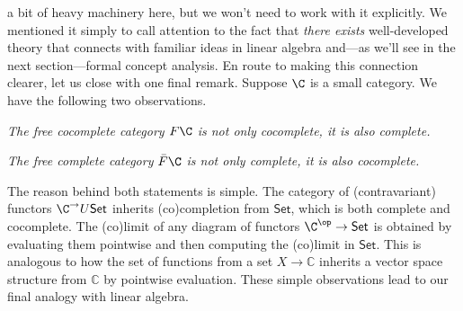 
 a bit of heavy machinery here, but we won't need to work with it explicitly. We mentioned it simply to call attention to the fact that \textit{there exists} well-developed theory that connects with familiar ideas in linear algebra and---as we'll see in the next section---formal concept analysis. En route to making this connection clearer, let us close with one final remark. Suppose $\C$ is a small category. We have the following two observations.
\begin{description}
\item \textit{The free cocomplete category $F\C$ is not only cocomplete, it is also complete.}

\item \textit{The free complete category $\bar F \C$ is not only complete, it is also cocomplete.}
\end{description}
The reason behind both statements is simple. The category of (contravariant) functors $\C^\to U\mathsf{Set}$ inherits (co)completion from $\mathsf{Set}$, which is both complete and cocomplete. The (co)limit of any diagram of functors $\C^{\op}\to\mathsf{Set}$ is obtained by evaluating them pointwise and then computing the (co)limit in $\mathsf{Set}$. This is analogous to how the set of functions from a set $X\to\mathbb{C}$ inherits a vector space structure from $\mathbb{C}$ by pointwise evaluation. These simple observations lead to our final analogy with linear algebra.

